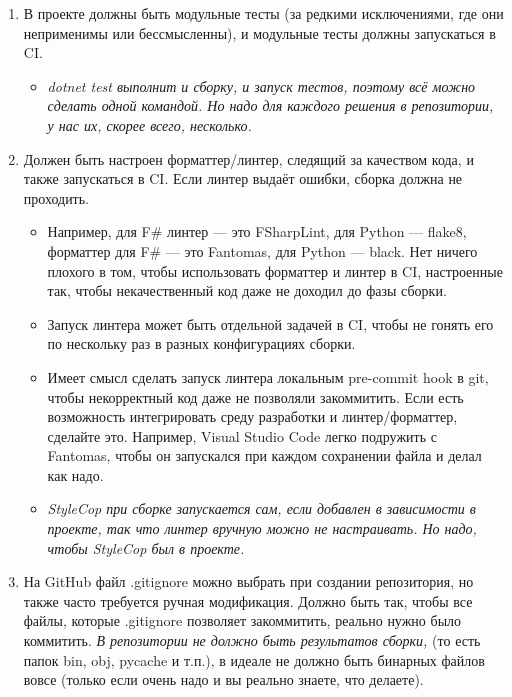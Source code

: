 \documentclass{../../text-style}
\begin{document}
\begin{enumerate}
\begin{itemize}
    \end{itemize}
    \item В проекте должны быть модульные тесты (за редкими исключениями, где они неприменимы или бессмысленны), и модульные тесты должны запускаться в CI.
    \begin{itemize}
        \item \emph{dotnet test выполнит и сборку, и запуск тестов, поэтому всё можно сделать одной командой. Но надо для каждого решения в репозитории, у нас их, скорее всего, несколько.}
    \end{itemize}
    \item Должен быть настроен форматтер/линтер, следящий за качеством кода, и также запускаться в CI. Если линтер выдаёт ошибки, сборка должна не проходить.
    \begin{itemize}
        \item Например, для F\# линтер --- это FSharpLint, для Python --- flake8, форматтер для F\# --- это Fantomas, для Python --- black. Нет ничего плохого в том, чтобы использовать форматтер и линтер в CI, настроенные так, чтобы некачественный код даже не доходил до фазы сборки.
        \item Запуск линтера может быть отдельной задачей в CI, чтобы не гонять его по нескольку раз в разных конфигурациях сборки.
        \item Имеет смысл сделать запуск линтера локальным pre-commit hook в git, чтобы некорректный код даже не позволяли закоммитить. Если есть возможность интегрировать среду разработки и линтер/форматтер, сделайте это. Например, Visual Studio Code легко подружить с Fantomas, чтобы он запускался при каждом сохранении файла и делал как надо.
    \end{itemize}
    \begin{itemize}
        \item \emph{StyleCop при сборке запускается сам, если добавлен в зависимости в проекте, так что линтер вручную можно не настраивать. Но надо, чтобы StyleCop был в проекте.}
    \end{itemize}
    \item На GitHub файл .gitignore можно выбрать при создании репозитория, но также часто требуется ручная модификация. Должно быть так, чтобы все файлы, которые .gitignore позволяет закоммитить, реально нужно было коммитить. \emph{В репозитории не должно быть результатов сборки,} (то есть папок bin, obj, pycache и т.п.), в идеале не должно быть бинарных файлов вовсе (только если очень надо и вы реально знаете, что делаете).

\end{enumerate}
\end{document}
